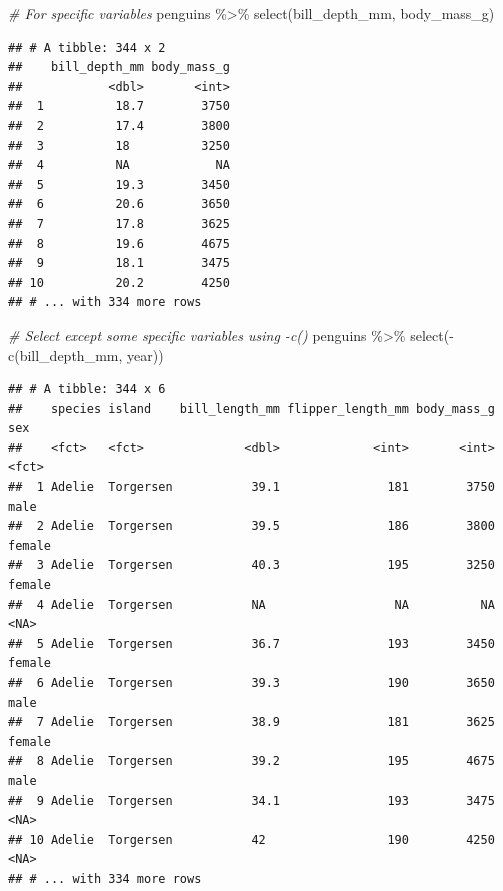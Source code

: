 \documentclass[
]{article}
\newenvironment{Shaded}{\begin{snugshade}}{\end{snugshade}}
\newcommand{\CommentTok}[1]{\textcolor[rgb]{0.56,0.35,0.01}{\textit{#1}}}
\newcommand{\FunctionTok}[1]{\textcolor[rgb]{0.00,0.00,0.00}{#1}}
\newcommand{\NormalTok}[1]{#1}
\newcommand{\SpecialCharTok}[1]{\textcolor[rgb]{0.00,0.00,0.00}{#1}}
\begin{document}
\begin{Shaded}
\begin{Highlighting}[]
\CommentTok{\# For specific variables}
\NormalTok{penguins }\SpecialCharTok{\%\textgreater{}\%} 
  \FunctionTok{select}\NormalTok{(bill\_depth\_mm, body\_mass\_g)}
\end{Highlighting}
\end{Shaded}

\begin{verbatim}
## # A tibble: 344 x 2
##    bill_depth_mm body_mass_g
##            <dbl>       <int>
##  1          18.7        3750
##  2          17.4        3800
##  3          18          3250
##  4          NA            NA
##  5          19.3        3450
##  6          20.6        3650
##  7          17.8        3625
##  8          19.6        4675
##  9          18.1        3475
## 10          20.2        4250
## # ... with 334 more rows
\end{verbatim}

\begin{Shaded}
\begin{Highlighting}[]
\CommentTok{\# Select except some specific variables using {-}c()}
\NormalTok{penguins }\SpecialCharTok{\%\textgreater{}\%} 
  \FunctionTok{select}\NormalTok{(}\SpecialCharTok{{-}}\FunctionTok{c}\NormalTok{(bill\_depth\_mm, year))}
\end{Highlighting}
\end{Shaded}

\begin{verbatim}
## # A tibble: 344 x 6
##    species island    bill_length_mm flipper_length_mm body_mass_g sex   
##    <fct>   <fct>              <dbl>             <int>       <int> <fct> 
##  1 Adelie  Torgersen           39.1               181        3750 male  
##  2 Adelie  Torgersen           39.5               186        3800 female
##  3 Adelie  Torgersen           40.3               195        3250 female
##  4 Adelie  Torgersen           NA                  NA          NA <NA>  
##  5 Adelie  Torgersen           36.7               193        3450 female
##  6 Adelie  Torgersen           39.3               190        3650 male  
##  7 Adelie  Torgersen           38.9               181        3625 female
##  8 Adelie  Torgersen           39.2               195        4675 male  
##  9 Adelie  Torgersen           34.1               193        3475 <NA>  
## 10 Adelie  Torgersen           42                 190        4250 <NA>  
## # ... with 334 more rows
\end{verbatim}
\end{document}

